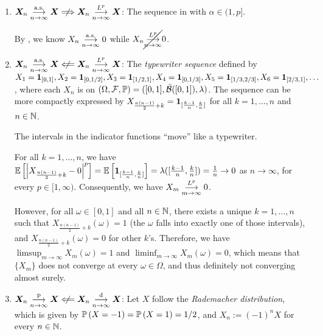 \begin{enumerate}
\begin{enumerate}[label={(\arabic*)}]
\begin{pf}
By , we know \(X_n\topr 0\) while
\(X_n\cancel{\tolp}0\).
\end{pf}
\item \(\vect{X}_n\toas \vect{X}\centernot\Longrightarrow \vect{X}_n\tolp\vect{X}\):
The sequence in  with \(\alpha\in (1,p]\).

\begin{pf}
By , we know \(X_n\underset{n\to\infty}{\overset{\text{a.s.}}{\longrightarrow}} 0\) while
\(X_n\cancel{\tolp}0\).
\end{pf}
\item \(\vect{X}_n\toas \vect{X}\centernot\Longleftarrow
\vect{X}_n\tolp\vect{X}\): The \emph{typewriter sequence} defined by
\(X_1=\mathbf{1}_{[0,1]}, X_2=\mathbf{1}_{[0,1/2]}, X_3=\mathbf{1}_{[1/2,1]},
X_4=\mathbf{1}_{[0,1/3]}, X_5=\mathbf{1}_{[1/3,2/3]}, X_6=\mathbf{1}_{[2/3,1]}, \dotsc\),
where each \(X_n\) is on
\((\Omega,\mathcal{F},\mathbb{P})=([0,1],\bar{\mathcal{B}}([0,1]),\lambda)\).
The sequence can be more compactly expressed by
\(X_{\frac{n(n-1)}{2}+k}=\mathbf{1}_{[\frac{k-1}{n},\frac{k}{n}]}\) for all
\(k=1,\dotsc,n\) and \(n\in\mathbb{N}\).
\begin{intuition}
The intervals in the indicator functions ``move'' like a typewriter.
\end{intuition}

\begin{pf}
For all \(k=1,\dotsc,n\), we have \(\mathbb{E}\left[\left|X_{\frac{n(n-1)}{2}+k}-0\right|^{p}\right]
=\mathbb{E}\left[\mathbf{1}_{[\frac{k-1}{n},\frac{k}{n}]}\right]=\lambda([\frac{k-1}{n},\frac{k}{n}])
=\frac{1}{n}\to 0\) as \(n\to\infty\), for every \(p\in[1,\infty)\).
Consequently, we have \(X_m\underset{m\to\infty}{\overset{L^p}{\longrightarrow}} 0\).

However, for all \(\omega\in[0,1]\) and all \(n\in\mathbb{N}\), there exists a unique
\(k=1,\dotsc,n\) such that \(X_{\frac{n(n-1)}{2}+k}(\omega)=1\) (the \(\omega\)
falls into exactly one of those intervals), and \(X_{\frac{n(n-1)}{2}+k}(\omega)=0\)
for other \(k\)'s. Therefore, we have \(\limsup_{m\to \infty}X_m(\omega)=1\)
and \(\liminf_{m\to \infty}X_m(\omega)=0\), which means that \(\{X_m\}\) does
not converge at every \(\omega\in \Omega\), and thus definitely not converging
almost surely.
\end{pf}
\item \(\vect{X}_n\topr \vect{X}\centernot\Longleftarrow
\vect{X}_n\tod\vect{X}\): Let \(X\) follow the \emph{Rademacher distribution},
which is given by \(\mathbb{P}\left(X=-1\right)=\mathbb{P}\left(X=1\right)=1/2\), and \(X_n:=(-1)^{n}X\) for
every \(n\in\mathbb{N}\).


\end{enumerate}
\end{enumerate}
